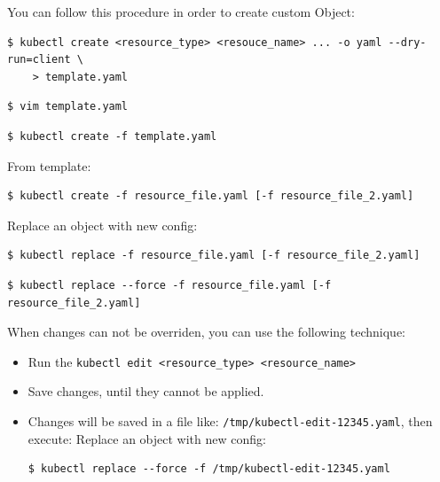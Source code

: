 \documentclass{article}
\newenvironment{blocktemplateI}[1]{%
    \tcolorbox[beamer,%
    noparskip,breakable,
    colframe=Violet,%
    colbacklower=Black,%
    title=#1]}%
    {\endtcolorbox}
\newenvironment{blocktemplateII}[1]{%
    \tcolorbox[beamer,%
    noparskip,breakable,
    colframe=Green,%
    colbacklower=LimeGreen!75!LightGreen,%
    title=#1]}%
    {\endtcolorbox}
\newenvironment{codetemplate}[1][]{%
  \mybasecolorbox[#1]
  \itshape
}{%
  \endmybasecolorbox
}
\begin{document}
\begin{blocktemplateII}{NOTE}
You can follow this procedure in order to create custom Object:
\begin{codetemplate}{}
\begin{verbatim}
$ kubectl create <resource_type> <resouce_name> ... -o yaml --dry-run=client \ 
    > template.yaml
\end{verbatim}
\end{codetemplate}
\begin{codetemplate}{}
\begin{verbatim}
$ vim template.yaml
\end{verbatim}
\end{codetemplate}
\begin{codetemplate}{}
\begin{verbatim}
$ kubectl create -f template.yaml
\end{verbatim}
\end{codetemplate}
\end{blocktemplateII}

From template:
\begin{codetemplate}
\begin{verbatim}
$ kubectl create -f resource_file.yaml [-f resource_file_2.yaml]
\end{verbatim}
\end{codetemplate}

Replace an object with new config:
\begin{codetemplate}
\begin{verbatim}
$ kubectl replace -f resource_file.yaml [-f resource_file_2.yaml]
\end{verbatim}
\end{codetemplate}
\begin{codetemplate}
\begin{verbatim}
$ kubectl replace --force -f resource_file.yaml [-f resource_file_2.yaml]
\end{verbatim}
\end{codetemplate}

\begin{blocktemplateI}{NOTE}
When changes can not be overriden, you can use the following technique:
\begin{itemize}
    \item Run the \verb|kubectl edit <resource_type> <resource_name>|
    \item Save changes, until they cannot be applied.
    \item Changes will be saved in a file like: \verb|/tmp/kubectl-edit-12345.yaml|, then execute:
Replace an object with new config:
\begin{codetemplate}
\begin{verbatim}
$ kubectl replace --force -f /tmp/kubectl-edit-12345.yaml
\end{verbatim}
\end{codetemplate}
\end{itemize}
\end{blocktemplateI}
\end{document}
